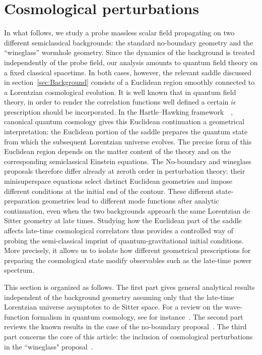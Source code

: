 \documentclass[a4paper,11pt]{article}
\begin{document}
\section{Cosmological perturbations}\label{sec:cosmological_perturbations}
In what follows, we study a probe massless scalar field propagating on two different semiclassical backgrounds: the standard no-boundary geometry and the “wineglass” wormhole geometry. Since the dynamics of the background is treated independently of the probe field, our analysis amounts to quantum field theory on a fixed classical spacetime. In both cases, however, the relevant saddle discussed in section~\ref{sec:Background} consists of a Euclidean region smoothly connected to a Lorentzian cosmological evolution. It is well known that in quantum field theory, in order to render the correlation functions well defined a certain $i\epsilon$ prescription should be incorporated. In the Hartle–Hawking framework~\cite{Hartle:1983ai}~\cite{Halliwell:1984eu}, canonical quantum cosmology gives this Euclidean continuation a geometrical interpretation: the Euclidean portion of the saddle prepares the quantum state from which the subsequent Lorentzian universe evolves. The precise form of this Euclidean region depends on the matter content of the theory and on the corresponding semiclassical Einstein equations. The No-boundary and wineglass proposals therefore differ already at zeroth order in perturbation theory: their minisuperspace equations select distinct Euclidean geometries and impose different conditions at the initial end of the contour. These different state-preparation geometries lead to different mode functions after analytic continuation, even when the two backgrounds approach the same Lorentzian de Sitter geometry at late times. Studying how the Euclidean part of the saddle affects late-time cosmological correlators thus provides a controlled way of probing the semi-classical imprint of quantum-gravitational initial conditions. More precisely, it allows us to isolate how different geometrical prescriptions for preparing the cosmological state modify observables such as the late-time power spectrum.


This section is organized as follows. The first part gives general analytical results independent of the background geometry assuming only that the late-time Lorentzian universe asymptotes to de Sitter space. For a review on the wave-function formalism in quantum cosmology, see for instance~\cite{halliwell2009introductorylecturesquantumcosmology,Halliwell:1984eu,Baumann:2014nda}. The second part reviews the known results in the case of the no-boundary proposal~\cite{Hartle:1983ai,Halliwell:1984eu,Lehners:2023yrj,Maldacena:2024uhs,PhysRevD.37.888}. The third part concerns the core of this article: the inclusion of cosmological perturbations in the ``wineglass" proposal~\cite{Betzios:2024oli,Betzios:2024zhf,Betzios:2026rbv}.
\end{document}
